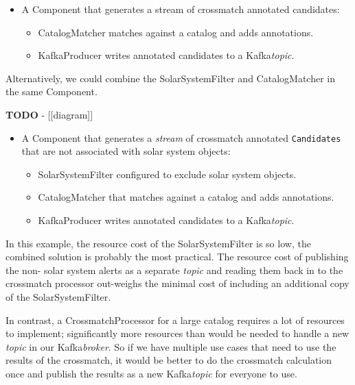 \documentclass{article}
\newcommand{\kafka} {Kafka\xspace}
\newcommand{\kftopic} {\textit{topic}\xspace}
\newcommand{\kfstream} {\textit{stream}\xspace}
\newcommand{\kfbroker} {\textit{broker}\xspace}
\newcommand{\crossmatch} {crossmatch\xspace}
\newcommand{\catalog} {catalog\xspace}
\newcommand{\javaname}[1] {{\ttfamily\color{codeblue} #1}}
\begin{document}
\begin{itemize}
    \item A \javaname{Component} that generates a stream of \crossmatch annotated candidates:
    \begin{itemize}
        \item \javaname{CatalogMatcher} matches against a \catalog and adds annotations.
    \end{itemize}
    \begin{itemize}
        \item \javaname{KafkaProducer} writes annotated candidates to a \kafka \kftopic.
    \end{itemize}
\end{itemize}

Alternatively, we could combine the \javaname{SolarSystemFilter} and \javaname{CatalogMatcher} in the same \javaname{Component}.

\textbf{TODO} - [[diagram]]

\begin{itemize}
    \item A \javaname{Component} that generates a \kfstream of \crossmatch annotated \texttt{Candidates} that are not associated with solar system objects:
    \begin{itemize}
        \item \javaname{SolarSystemFilter} configured to exclude solar system objects.
    \end{itemize}
    \begin{itemize}
        \item \javaname{CatalogMatcher} that matches against a \catalog and adds annotations.
    \end{itemize}
    \begin{itemize}
        \item \javaname{KafkaProducer} writes annotated candidates to a \kafka \kftopic.
    \end{itemize}
\end{itemize}

In this example, the resource cost of the \javaname{SolarSystemFilter} is so low, the combined solution is probably the most practical. The resource cost of publishing the non- solar system alerts as a separate \kftopic and reading them back in to the \crossmatch processor out-weighs the minimal cost of including an additional copy of the \javaname{SolarSystemFilter}.

In contrast, a \javaname{CrossmatchProcessor} for a large \catalog requires a lot of resources to implement; significantly more resources than would be needed to handle a new \kftopic in our \kafka \kfbroker. So if we have multiple use cases that need to use the results of the \crossmatch, it would be better to do the \crossmatch calculation once and publish the results as a new \kafka \kftopic for everyone to use.
\end{document}
